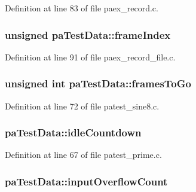 Definition at line 83 of file paex\+\_\+record.\+c.

\subsubsection[{\texorpdfstring{frame\+Index}{frameIndex}}]{\setlength{\rightskip}{0pt plus 5cm}unsigned pa\+Test\+Data\+::frame\+Index}\hypertarget{structpa_test_data_ac1ad17615e0f7ece813445491dc62d2c}{}\label{structpa_test_data_ac1ad17615e0f7ece813445491dc62d2c}


Definition at line 91 of file paex\+\_\+record\+\_\+file.\+c.

\subsubsection[{\texorpdfstring{frames\+To\+Go}{framesToGo}}]{\setlength{\rightskip}{0pt plus 5cm}unsigned {\bf int} pa\+Test\+Data\+::frames\+To\+Go}\hypertarget{structpa_test_data_ab9c9ad798396a89553cd709aedfdf169}{}\label{structpa_test_data_ab9c9ad798396a89553cd709aedfdf169}


Definition at line 72 of file patest\+\_\+sine8.\+c.

\subsubsection[{\texorpdfstring{idle\+Countdown}{idleCountdown}}]{ pa\+Test\+Data\+::idle\+Countdown}\hypertarget{structpa_test_data_a177b3cb30e100d85f39780e93c97a62b}{}\label{structpa_test_data_a177b3cb30e100d85f39780e93c97a62b}


Definition at line 67 of file patest\+\_\+prime.\+c.

\subsubsection[{\texorpdfstring{input\+Overflow\+Count}{inputOverflowCount}}]{ pa\+Test\+Data\+::input\+Overflow\+Count}\hypertarget{structpa_test_data_a5aa0b4507ba105c0e8e630ef29ee44a1}{}\label{structpa_test_data_a5aa0b4507ba105c0e8e630ef29ee44a1}


